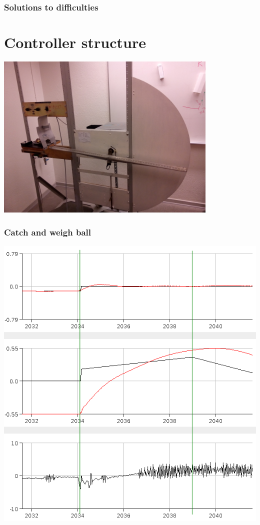 \documentclass[
compress]
{beamer}
\begin{document}
\begin{frame}
\frametitle{Solutions to difficulties}

\end{frame}

\section{Controller structure}
\frame{\sectionpage}
\begin{frame}
\centering
\includegraphics[width=0.8\textwidth]{figures/process_fig.jpg}
\end{frame}

\begin{frame}
\frametitle{Catch and weigh ball}
\centering
\includegraphics[height=0.83\textheight]{figures/weighmediumball-crop.png}
\end{frame}
\end{document}
